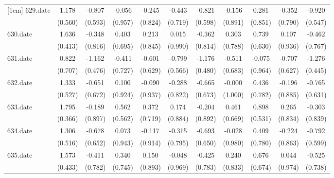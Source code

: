 \begin{tabular}{l*{10}{c}}
[1em]
629.date    &       1.178&      -0.807&      -0.056&      -0.245&      -0.443&      -0.821&      -0.156&       0.281&      -0.352&      -0.920\\
            &     (0.560)&     (0.593)&     (0.957)&     (0.824)&     (0.719)&     (0.598)&     (0.891)&     (0.851)&     (0.790)&     (0.547)\\
[1em]
630.date    &       1.636&      -0.348&       0.403&       0.213&       0.015&      -0.362&       0.303&       0.739&       0.107&      -0.462\\
            &     (0.413)&     (0.816)&     (0.695)&     (0.845)&     (0.990)&     (0.814)&     (0.788)&     (0.630)&     (0.936)&     (0.767)\\
[1em]
631.date    &       0.822&      -1.162&      -0.411&      -0.601&      -0.799&      -1.176&      -0.511&      -0.075&      -0.707&      -1.276\\
            &     (0.707)&     (0.476)&     (0.727)&     (0.629)&     (0.566)&     (0.480)&     (0.683)&     (0.964)&     (0.627)&     (0.445)\\
[1em]
632.date    &       1.333&      -0.651&       0.100&      -0.090&      -0.288&      -0.665&      -0.000&       0.436&      -0.196&      -0.765\\
            &     (0.527)&     (0.672)&     (0.924)&     (0.937)&     (0.822)&     (0.673)&     (1.000)&     (0.782)&     (0.885)&     (0.631)\\
[1em]
633.date    &       1.795&      -0.189&       0.562&       0.372&       0.174&      -0.204&       0.461&       0.898&       0.265&      -0.303\\
            &     (0.366)&     (0.897)&     (0.562)&     (0.719)&     (0.884)&     (0.892)&     (0.669)&     (0.531)&     (0.834)&     (0.839)\\
[1em]
634.date    &       1.306&      -0.678&       0.073&      -0.117&      -0.315&      -0.693&      -0.028&       0.409&      -0.224&      -0.792\\
            &     (0.516)&     (0.652)&     (0.943)&     (0.914)&     (0.795)&     (0.650)&     (0.980)&     (0.780)&     (0.863)&     (0.599)\\
[1em]
635.date    &       1.573&      -0.411&       0.340&       0.150&      -0.048&      -0.425&       0.240&       0.676&       0.044&      -0.525\\
            &     (0.433)&     (0.782)&     (0.745)&     (0.893)&     (0.969)&     (0.783)&     (0.833)&     (0.674)&     (0.974)&     (0.738)\\

\end{tabular}
